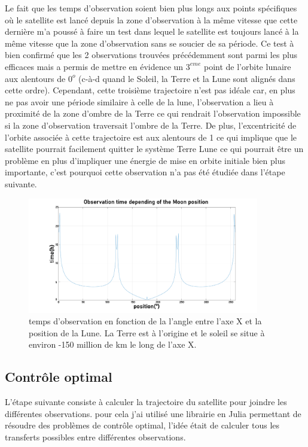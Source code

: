 \documentclass[11pt]{article} %
\begin{document}
		Le fait que les temps d'observation soient bien plus longs aux points spécifiques où le satellite est lancé depuis la zone d'observation à la même vitesse que cette dernière m'a poussé à faire un test dans lequel le satellite est toujours lancé à la même vitesse que la zone d'observation sans se soucier de sa période. Ce test à bien confirmé que les 2 observations trouvées précédemment sont parmi les plus efficaces mais a permis de mettre en évidence un $3^{eme}$ point de l'orbite lunaire aux alentours de $0^o$ (c-à-d quand le Soleil, la Terre et la Lune sont alignés dans cette ordre). Cependant, cette troisième trajectoire n'est pas idéale car, en plus ne pas avoir une période similaire à celle de la lune, l'observation a lieu à proximité de la zone d'ombre de la Terre ce qui rendrait l'observation impossible si la zone d'observation traversait l'ombre de la Terre. De plus, l'excentricité de l'orbite associée à cette trajectoire est aux alentours de 1 ce qui implique que le satellite pourrait facilement quitter le système Terre Lune ce qui pourrait être un problème en plus d'impliquer une énergie de mise en orbite initiale bien plus importante, c'est pourquoi cette observation n'a pas été étudiée dans l'étape suivante.
		\begin{figure}[h]
			\includegraphics[width=0.9\textwidth]{images/observation_Obs.png}
			\caption{temps d'observation en fonction de la l'angle entre l'axe X et la position de la Lune. La Terre est à l'origine et le soleil se situe à environ -150 million de km le long de l'axe X.}
		\end{figure}
		
		
		\subsection{Contrôle optimal}
		
		L'étape suivante consiste à calculer la trajectoire du satellite pour joindre les différentes observations.
		pour cela j'ai utilisé une librairie en Julia permettant de résoudre des problèmes de contrôle optimal, l'idée était de calculer tous les transferts possibles entre différentes observations.
		
\end{document}
